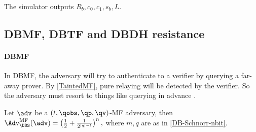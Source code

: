 The simulator outputs \(R_b, c_0, c_1, s_b, L\).


\subsection{\acs*{DBMF}, \acs*{DBTF} and \acs*{DBDH} resistance}

\paragraph{\Acl{DBMF}}

In \ac{DBMF}, the adversary will try to authenticate to a verifier by querying 
a far-away prover.
By \cref{TaintedMF}, pure relaying will be detected by the verifier.
So the adversary must resort to things like querying in advance \etc.

\begin{theorem}
  Let \(\adv\) be a \((t, \qobs, \qp, \qv)\)-MF adversary, then \(
    \Adv_{\DBS}^{\text{MF}}(\adv) =
      \left(\frac{1}{2} + \frac{1}{2^{|q|-l}}\right)^n,
  \) where \(m, q\) are as in \cref{DB-Schnorr-nbit}.
\end{theorem}


